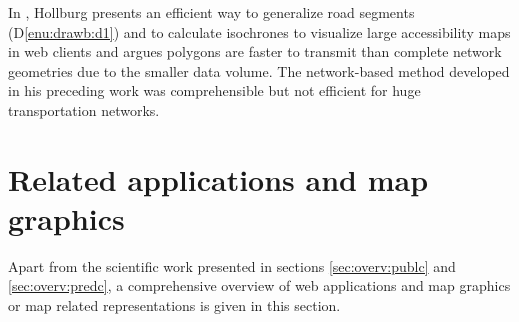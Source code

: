     In \cite{Hollburg2014}, Hollburg
    presents an efficient way to generalize road segments (D\ref{enu:drawb:d1})
    and to calculate
    isochrones to visualize large accessibility maps in web clients and argues
    polygons are faster to transmit than complete network geometries due to the
    smaller data volume. The network-based method developed in his preceding
    work was comprehensible but not efficient for huge transportation networks.

  \section{Related applications and map graphics}
    \label{sec:overv:applc}



    Apart from the scientific work presented in sections \ref{sec:overv:publc}
    and \ref{sec:overv:predc}, a comprehensive overview of web applications
    and map graphics or map related representations is given in this
    section.\par






